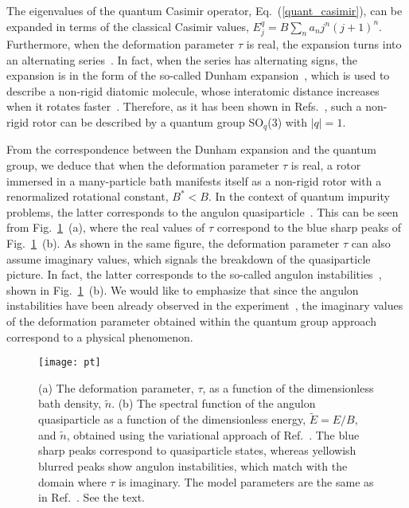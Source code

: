 \documentclass[aps,prl,reprint,showpacs,floatfix]{revtex4-1}
\begin{document}
The eigenvalues of the quantum Casimir operator, Eq.~(\ref{quant_casimir}), can be expanded in terms of the classical Casimir values, $E^q_j = B \sum_n a_n j^n (j+1)^n$. Furthermore, when the deformation parameter $\tau$ is real, the expansion turns into an alternating series~\cite{raychev1995quantum}. In fact, when the series has alternating signs, the expansion is in the form of the so-called Dunham expansion~\cite{Dunham_32}, which is used to describe a non-rigid diatomic molecule, whose interatomic distance increases when it rotates faster~\cite{huber2013molecular}. Therefore, as it has been shown in Refs.~\cite{esteve1992q,raychev1995quantum}, such a non-rigid rotor can be described by a quantum group  SO$_q$(3) with  $|q|=1$.

From the correspondence between the Dunham expansion and the quantum group, we deduce that when the deformation parameter $\tau$ is real, a rotor immersed in a many-particle bath manifests itself as a non-rigid rotor with a renormalized rotational constant, $B^\ast < B$. In the context of quantum impurity problems, the latter corresponds to the angulon quasiparticle~\cite{lemeshko2016quasiparticle, Lemeshko_2016_book}.  This can be seen from Fig.~\ref{tau}~(a), where the real values of $\tau$ correspond to the blue sharp peaks of  Fig.~\ref{tau}~(b).  As shown in the same figure, the deformation parameter $\tau$ can also assume imaginary values, which signals the breakdown of the quasiparticle picture. In fact, the latter corresponds to the so-called angulon instabilities~\cite{Lemeshko_2015,Cherepanov,Yakaboylu_2017,Yakaboylu_2017_b}, shown in Fig.~\ref{tau}~(b). We would like to emphasize that since the angulon instabilities have been already observed in the experiment~\cite{Cherepanov}, the imaginary values of the deformation parameter obtained within the quantum group approach correspond to a physical phenomenon.




\begin{figure}
  \centering
  \texttt{[image: pt]}
 \caption{(a) The deformation parameter, $\tau$, as a function of the dimensionless bath density, $\tilde{n}$. (b) The spectral function of the angulon quasiparticle as a function of the dimensionless energy, $\tilde{E} = E/B$, and $\tilde{n}$,  obtained using the variational approach of Ref.~\cite{PhysRevX.6.011012}. The blue sharp peaks correspond to quasiparticle states, whereas yellowish blurred peaks show angulon instabilities, which match with the domain where $\tau$ is imaginary. The model parameters are the same as in Ref.~\cite{bighin2018diagrammatic}. See the text.}
 \label{tau}
\end{figure}
\end{document}
